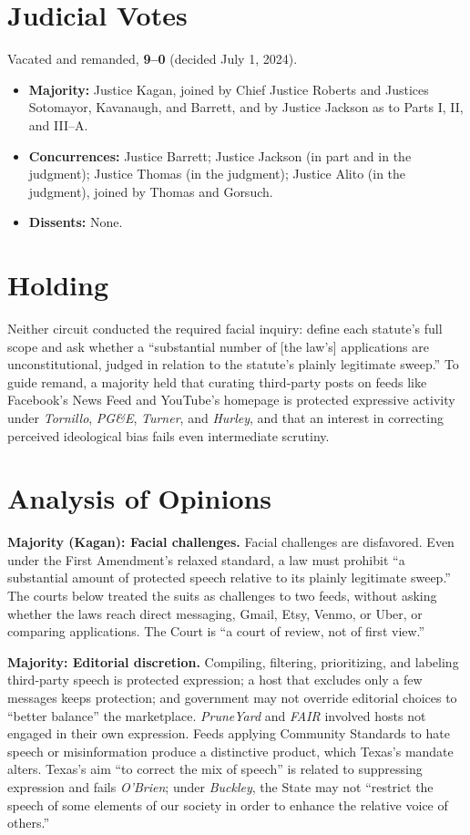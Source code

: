 \documentclass[12pt]{article}
\begin{document}
\section{Judicial Votes}

Vacated and remanded, \textbf{9--0} (decided July 1, 2024).
\begin{itemize}
\item \textbf{Majority:} Justice Kagan, joined by Chief Justice Roberts and Justices Sotomayor, Kavanaugh, and Barrett, and by Justice Jackson as to Parts I, II, and III--A.
\item \textbf{Concurrences:} Justice Barrett; Justice Jackson (in part and in the judgment); Justice Thomas (in the judgment); Justice Alito (in the judgment), joined by Thomas and Gorsuch.
\item \textbf{Dissents:} None.
\end{itemize}

\section{Holding}

Neither circuit conducted the required facial inquiry: define each statute's full scope and ask whether a ``substantial number of [the law's] applications are unconstitutional, judged in relation to the statute's plainly legitimate sweep.'' To guide remand, a majority held that curating third-party posts on feeds like Facebook's News Feed and YouTube's homepage is protected expressive activity under \textit{Tornillo}, \textit{PG\&E}, \textit{Turner}, and \textit{Hurley}, and that an interest in correcting perceived ideological bias fails even intermediate scrutiny.

\section{Analysis of Opinions}

\textbf{Majority (Kagan): Facial challenges.} Facial challenges are disfavored. Even under the First Amendment's relaxed standard, a law must prohibit ``a substantial amount of protected speech relative to its plainly legitimate sweep.'' The courts below treated the suits as challenges to two feeds, without asking whether the laws reach direct messaging, Gmail, Etsy, Venmo, or Uber, or comparing applications. The Court is ``a court of review, not of first view.''

\textbf{Majority: Editorial discretion.} Compiling, filtering, prioritizing, and labeling third-party speech is protected expression; a host that excludes only a few messages keeps protection; and government may not override editorial choices to ``better balance'' the marketplace. \textit{PruneYard} and \textit{FAIR} involved hosts not engaged in their own expression. Feeds applying Community Standards to hate speech or misinformation produce a distinctive product, which Texas's mandate alters. Texas's aim ``to correct the mix of speech'' is related to suppressing expression and fails \textit{O'Brien}; under \textit{Buckley}, the State may not ``restrict the speech of some elements of our society in order to enhance the relative voice of others.''
\end{document}
